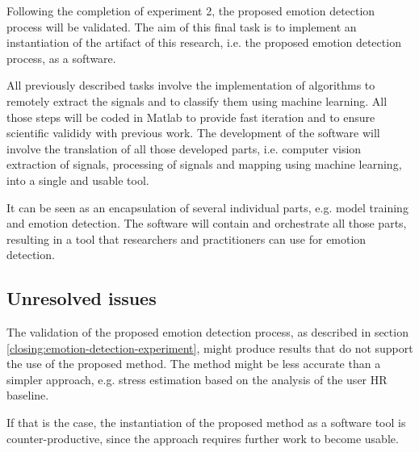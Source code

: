 Following the completion of experiment 2, the proposed emotion detection process will be validated. The aim of this final task is to implement an instantiation of the artifact of this research, i.e. the proposed emotion detection process, as a software.

All previously described tasks involve the implementation of algorithms to remotely extract the signals and to classify them using machine learning. All those steps will be coded in Matlab to provide fast iteration and to ensure scientific valididy with previous work. The development of the software will involve the translation of all those developed parts, i.e. computer vision extraction of signals, processing of signals and mapping using machine learning, into a single and usable tool.

It can be seen as an encapsulation of several individual parts, e.g. model training and emotion detection. The software will contain and orchestrate all those parts, resulting in a tool that researchers and practitioners can use for emotion detection.

\subsection{Unresolved issues}

The validation of the proposed emotion detection process, as described in section \ref{closing:emotion-detection-experiment}, might produce results that do not support the use of the proposed method. The method might be less accurate than a simpler approach, e.g. stress estimation based on the analysis of the user HR baseline.

If that is the case, the instantiation of the proposed method as a software tool is counter-productive, since the approach requires further work to become usable.


